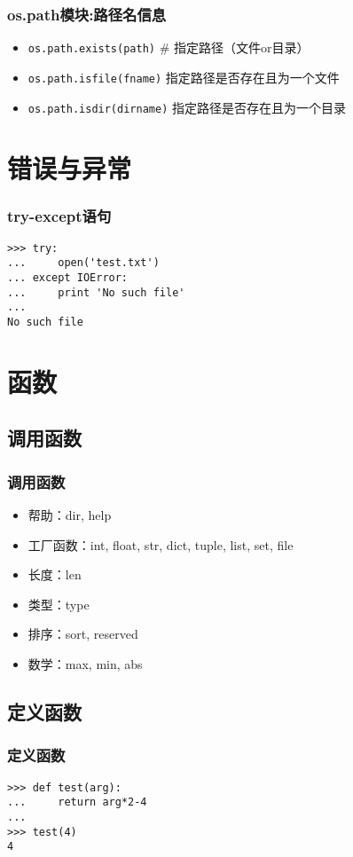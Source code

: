 \documentclass[13pt]{beamer}
\begin{document}
\begin{frame}
\frametitle{os.path模块:路径名信息}
\begin{itemize}
  \item \lstinline{os.path.exists(path)} \# 指定路径（文件or目录）
  \item \lstinline{os.path.isfile(fname)}  指定路径是否存在且为一个文件
  \item \lstinline{os.path.isdir(dirname)}  指定路径是否存在且为一个目录
\end{itemize}
\end{frame}

\section{错误与异常}
\begin{frame}[containsverbatim]
\frametitle{try-except语句}
\begin{lstlisting}
>>> try:
...     open('test.txt')
... except IOError:
...     print 'No such file'
...
No such file
\end{lstlisting}
\end{frame}
 
\section{函数}
\subsection{调用函数}
\begin{frame}
\frametitle{调用函数}
\begin{itemize}
  \item 帮助：dir, help
  \item 工厂函数：int, float, str, dict, tuple, list, set, file
  \item 长度：len
  \item 类型：type
  \item 排序：sort, reserved
  \item 数学：max, min, abs
\end{itemize}
\end{frame}

\subsection{定义函数}
\begin{frame}[containsverbatim]
\frametitle{定义函数}
\begin{lstlisting}
>>> def test(arg):
...     return arg*2-4
...
>>> test(4)
4
\end{lstlisting}
\end{frame}
\end{document}

